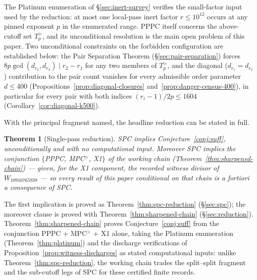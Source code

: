 \documentclass[11pt]{amsart}
\theoremstyle{plain}
\newtheorem{theorem}{Theorem}[section]
\theoremstyle{definition}
\theoremstyle{remark}
\numberwithin{equation}{section}
\begin{document}
The Platinum enumeration of \S\ref{sec:inert-survey} verifies the small-factor input used by the reduction: at most one local-pass inert factor $r \leq 10^{12}$ occurs at any pinned exponent $p$ in the enumerated range. PPPC itself concerns the above-cutoff set $T_p^{>}$, and its unconditional resolution is the main open problem of this paper. Two unconditional constraints on the forbidden configuration are established below: the Pair Separation Theorem (\S\ref{sec:pair-separation}) forces $8 p \gcd(d_{r_1}, d_{r_2}) \mid r_2 - r_1$ for any two members of $T_p^{>}$, and the diagonal ($d_{r_1} = d_{r_2}$) contribution to the pair count vanishes for every admissible order parameter $d \leq 400$ (Propositions~\ref{prop:diagonal-closures} and~\ref{prop:danger-census-400}), in particular for every pair with both indices $(r_i - 1)/2p \leq 1604$ (Corollary~\ref{cor:diagonal-k500}).

With the principal fragment named, the headline reduction can be stated in full.

\begin{theorem}[Single-pass reduction]\label{thm:spc-intro}
SPC implies Conjecture~\ref{conj:suff}, unconditionally and with no computational input. Moreover SPC implies the conjunction $\{$PPPC, MPC$^{>}$, X1$\}$ of the working chain (Theorem~\ref{thm:sharpened-chain}) --- given, for the X1 component, the recorded witness divisor of $W_{10916765939}$ --- so every result of this paper conditional on that chain is a fortiori a consequence of SPC.
\end{theorem}

The first implication is proved as Theorem~\ref{thm:spc-reduction} (\S\ref{sec:spc}); the moreover clause is proved with Theorem~\ref{thm:sharpened-chain} (\S\ref{sec:reduction}).
Theorem~\ref{thm:sharpened-chain} proves Conjecture~\ref{conj:suff} from the conjunction PPPC + MPC$^{>}$ + X1 alone, taking the Platinum enumeration (Theorem~\ref{thm:platinum}) and the discharge verifications of Proposition~\ref{prop:witness-discharges} as stated computational inputs: unlike Theorem~\ref{thm:spc-reduction}, the working chain trades the split--split fragment and the sub-cutoff legs of SPC for these certified finite records.
\end{document}
